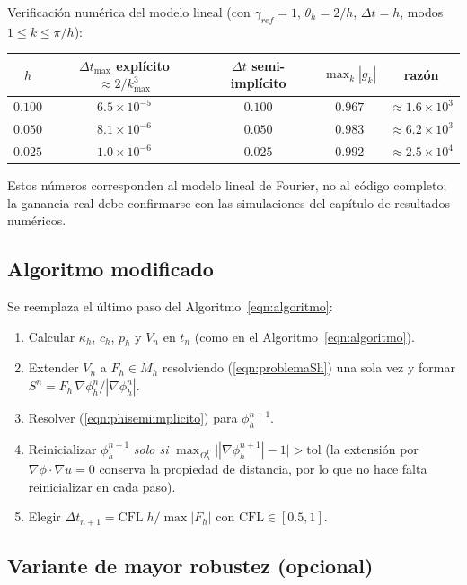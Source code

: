 Verificación numérica del modelo lineal (con $\gamma_{ref}=1$, $\theta_h=2/h$, $\Delta t=h$, modos $1\le k\le\pi/h$):
\begin{center}
\begin{tabular}{ccccc}
\toprule
$h$ & $\Delta t_{\max}$ explícito $\approx 2/k_{\max}^3$ & $\Delta t$ semi-implícito & $\max_k|g_k|$ & razón\\
\midrule
$0.100$ & $6.5\times10^{-5}$ & $0.100$ & $0.967$ & $\approx 1.6\times10^{3}$\\
$0.050$ & $8.1\times10^{-6}$ & $0.050$ & $0.983$ & $\approx 6.2\times10^{3}$\\
$0.025$ & $1.0\times10^{-6}$ & $0.025$ & $0.992$ & $\approx 2.5\times10^{4}$\\
\bottomrule
\end{tabular}
\end{center}
Estos números corresponden al modelo lineal de Fourier, no al código completo; la ganancia real debe confirmarse con las simulaciones del capítulo de resultados numéricos.

\subsection{Algoritmo modificado}

Se reemplaza el último paso del Algoritmo~\ref{eqn:algoritmo}:
\begin{enumerate}
	\item Calcular $\kappa_h$, $c_h$, $p_h$ y $V_n$ en $t_n$ (como en el Algoritmo~\ref{eqn:algoritmo}).
	\item Extender $V_n$ a $F_h\in M_h$ resolviendo (\ref{eqn:problemaSh}) una sola vez y formar $S^n=F_h\,\nabla\phi_h^n/|\nabla\phi_h^n|$.
	\item Resolver (\ref{eqn:phisemiimplicito}) para $\phi_h^{n+1}$.
	\item Reinicializar $\phi_h^{n+1}$ \emph{solo si} $\max_{\Omega_h^\Gamma}\big||\nabla\phi_h^{n+1}|-1\big|>\mathrm{tol}$ (la extensión por $\nabla\phi\cdot\nabla u=0$ conserva la propiedad de distancia, por lo que no hace falta reinicializar en cada paso).
	\item Elegir $\Delta t_{n+1}=\mathrm{CFL}\;h/\max|F_h|$ con $\mathrm{CFL}\in[0.5,1]$.
\end{enumerate}

\subsection{Variante de mayor robustez (opcional)}

